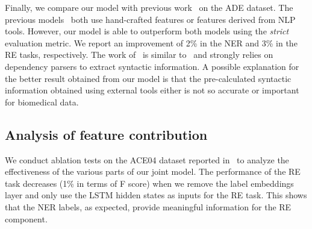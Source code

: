 \documentclass[review]{elsarticle}
\begin{document}
Finally, we compare our model with previous work~\citep{li:16,li:17} on the ADE dataset. The previous models~\citep{li:16,li:17} both use hand-crafted features or features derived from NLP tools. However, our model is able to outperform both models using the \emph{strict} evaluation metric.  We report an improvement of 2\% in the NER and 3\% in the RE tasks, respectively. 
The work of~\cite{li:17} is similar to~\cite{miwa:16} and strongly relies on dependency parsers to extract syntactic information. 
A possible explanation for the better result obtained from our model is that the pre-calculated syntactic information obtained using external tools either is not so accurate or important for biomedical data. 
\begin{table}
\caption{Ablation tests on the ACE04 test dataset.}
\label{tab:ablation}
 \end{table} 

\subsection{Analysis of feature contribution}
\label{sec:feature_contribution}
\noindent We conduct ablation tests on the
ACE04 dataset reported in~ to analyze the effectiveness of the various parts of our joint model.
The performance of the RE task decreases (1\% in terms of F score) when we remove the label embeddings layer and only use the LSTM hidden states as inputs for the RE task.
This shows that the NER labels, as expected, provide meaningful information for the RE component.
\end{document}

